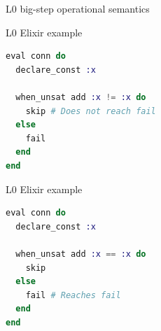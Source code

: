 \documentclass{beamer}
\begin{document}
  \begin{frame}{L0 big-step operational semantics}
    \begin{prooftree}
    \end{prooftree}

    \pause \medskip

    \begin{prooftree}
    \end{prooftree}
    
    \pause \medskip
    
    \begin{prooftree}
    \end{prooftree}
  \end{frame}

  \begin{frame}[fragile]{L0 Elixir example}
    \small
    \begin{lstlisting}[language=elixir,numbers=none,frame=none]
eval conn do
  declare_const :x

  when_unsat add :x != :x do
    skip # Does not reach fail
  else
    fail
  end
end
    \end{lstlisting}
  \end{frame}
  \begin{frame}[fragile]{L0 Elixir example}
    \small
    \begin{lstlisting}[language=elixir,numbers=none,frame=none]
eval conn do
  declare_const :x

  when_unsat add :x == :x do
    skip
  else
    fail # Reaches fail
  end
end
    \end{lstlisting}
  \end{frame}
\end{document}
